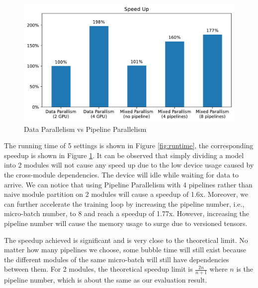 \documentclass[sigplan, nonacm]{acmart}\settopmatter{printfolios=true,printccs=false,printacmref=false}
\begin{document}
\begin{figure}[htbp]
  \centering
  \includegraphics[scale=0.5]{pipelineparallelspeedup.pdf}
  \caption{Data Parallelism vs Pipeline Parallelism}
  \label{fig:speedup}
\end{figure}
The running time of 5 settings is shown in Figure \ref{fig:runtime}, the corresponding speedup is shown in Figure \ref{fig:speedup}. It can be observed that simply dividing a model into 2 modules will not cause any speed up due to the low device usage caused by the cross-module dependencies. The device will idle while waiting for data to arrive. We can notice that using Pipeline Parallelism with 4 pipelines rather than naive module partition on 2 modules will cause a speedup of 1.6x. Moreover, we can further accelerate the training loop by increasing the pipeline number, i.e., micro-batch number, to 8 and reach a speedup of 1.77x. However, increasing the pipeline number will cause the memory usage to surge due to versioned tensors.\par
The speedup achieved is significant and is very close to the theoretical limit. No matter how many pipelines we choose, some bubble time will still exist because the different modules of the same micro-batch will still have dependencies between them. For 2 modules, the theoretical speedup limit is $\frac{2n}{n+1}$ where $n$ is the pipeline number, which is about the same as our evaluation result.\par
\end{document}
